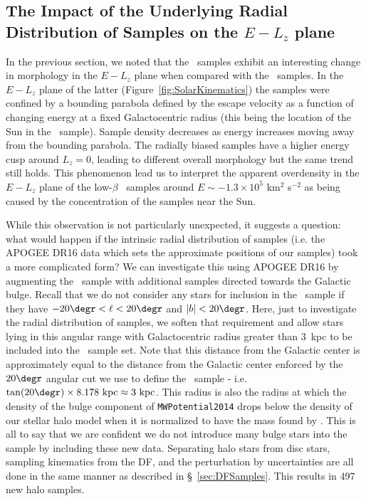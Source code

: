 \subsection{The Impact of the Underlying Radial Distribution of Samples on the \texorpdfstring{$E-L_{z}$}{E-Lz} plane}
\label{subsec:RadialBiases}

In the previous section, we noted that the \survey\ samples exhibit an interesting change in morphology in the $E-L_{z}$ plane when compared with the \solar\ samples. In the $E-L_{z}$ plane of the latter (Figure~\ref{fig:SolarKinematics}) the samples were confined by a bounding parabola defined by the escape velocity as a function of changing energy at a fixed Galactocentric radius (this being the location of the Sun in the \solar\ sample). Sample density decreases as energy increases moving away from the bounding parabola. The radially biased samples have a higher energy cusp around $L_{z}=0$, leading to different overall morphology but the same trend still holds. This phenomenon lead us to interpret the apparent overdensity in the $E-L_{z}$ plane of the low-$\beta$ \survey\ samples around $E \sim -1.3\times10^{5}$ km$^{2}$ s$^{-2}$ as being caused by the concentration of the samples near the Sun.

While this observation is not particularly unexpected, it suggests a question: what would happen if the intrinsic radial distribution of samples (i.e. the APOGEE DR16 data which sets the approximate positions of our samples) took a more complicated form? We can investigate this using APOGEE DR16 by augmenting the \survey\ sample with additional samples directed towards the Galactic bulge. Recall that we do not consider any stars for inclusion in the \survey\ sample if they have $-20\degr < \ell < 20\degr$ and $|b| < 20\degr$. Here, just to investigate the radial distribution of samples, we soften that requirement and allow stars lying in this angular range with Galactocentric radius greater than 3~kpc to be included into the \survey\ sample set. Note that this distance from the Galactic center is approximately equal to the distance from the Galactic center enforced by the $20\degr$ angular cut we use to define the \survey\ sample - i.e. $\tan(20\degr) \times 8.178~\mathrm{kpc} \approx 3~\mathrm{kpc}$. This radius is also the radius at which the density of the bulge component of \texttt{MWPotential2014} drops below the density of our stellar halo model when it is normalized to have the mass found by \textcite{mackereth20}. This is all to say that we are confident we do not introduce many bulge stars into the sample by including these new data. Separating halo stars from disc stars, sampling kinematics from the DF, and the perturbation by uncertainties are all done in the same manner as described in \S~\ref{sec:DFSamples}. This results in 497 new halo samples.

